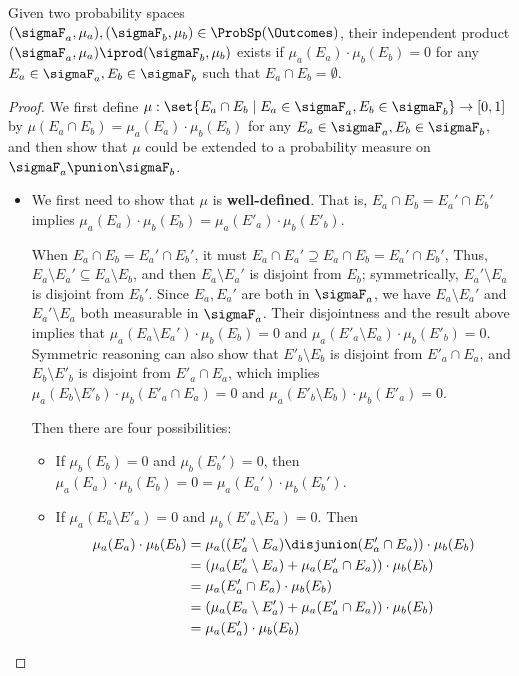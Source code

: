  \begin{lemma}
  \label{lemma:indep-prod-exists}
  Given two probability spaces
  $(\sigmaF_a, \mu_a), (\sigmaF_b, \mu_b) \in \ProbSp(\Outcomes)$,
  their independent product
  $(\sigmaF_a, \mu_a) \iprod (\sigmaF_b, \mu_b)$ exists
  if $\mu_a(E_a) \cdot \mu_b(E_b) = 0 $
  for any $E_a \in \sigmaF_a, E_b \in \sigmaF_b$ such that
  $E_a \cap E_b = \emptyset$.
 \end{lemma}

 \begin{proof}
We first define $\mu: \set{E_a \cap E_b \mid E_a \in \sigmaF_a, E_b \in \sigmaF_b}
  \to [0,1]$ by $\mu(E_a \cap E_b) = \mu_a(E_a) \cdot \mu_b(E_b)$
   for any $E_a \in \sigmaF_a, E_b \in \sigmaF_b$,
   and then show that $\mu$ could be extended to a probability
   measure on $\sigmaF_a \punion \sigmaF_b$.

  \begin{itemize}
   \item We first need to show that $\mu$ is \textbf{well-defined}.
    That is,
    $E_a \cap E_b = E_a' \cap E_b'$
    implies $\mu_a(E_a) \cdot \mu_b(E_b) = \mu_a(E'_a) \cdot \mu_b(E'_b)$.

     When $E_a \cap E_b = E_a' \cap E_b'$, it must $E_a \cap E_a' \supseteq
     E_a \cap E_b = E_a' \cap E_b'$, Thus, $E_a \setminus E_a' \subseteq E_a
     \setminus E_b$, and then $E_a \setminus E_a'$ is disjoint from $E_b$;
     symmetrically, $E_a' \setminus E_a$ is disjoint from $E_b'$.
     Since $E_a, E_a'$ are both in $\sigmaF_{a}$, we have $E_a \setminus E_a'$
     and $E_a' \setminus E_a$ both measurable in $\sigmaF_a$.
     Their disjointness and the result above implies that
     $\mu_a(E_a \setminus E_a') \cdot \mu_b(E_b) = 0$ and
     $\mu_a(E'_a \setminus E_a) \cdot \mu_b(E'_b) = 0$.
     Symmetric reasoning can also show that
     $E'_b \setminus E_b$ is disjoint from $E'_a \cap E_a$,
       and  $E_b \setminus E'_b$ is disjoint from $E'_a \cap E_a$,
       which implies
       $\mu_a(E_b \setminus E'_b) \cdot \mu_b(E'_a \cap E_a) = 0$ and
     $\mu_a(E'_b \setminus E_b) \cdot \mu_b(E'_a) = 0$.

     Then there are four possibilities:
     \begin{itemize}
      \item If $\mu_b(E_b) = 0$ and $\mu_b(E_b') = 0$,
       then $\mu_a(E_a) \cdot \mu_b(E_b) = 0 = \mu_a(E_a') \cdot \mu_b(E_b')$.
      \item If $\mu_a(E_a \setminus E'_a) = 0$ and $\mu_b(E'_a \setminus E_a) = 0$.
       Then
       \begin{align*}
        \mu_a(E_a) \cdot \mu_b(E_b) &=
        \mu_a((E'_a \setminus E_a) \disjunion (E'_a \cap E_a)) \cdot \mu_b(E_b) \\
          &= (\mu_a(E'_a \setminus E_a) + \mu_a(E'_a \cap E_a)) \cdot \mu_b(E_b) \\
          &= \mu_a(E'_a \cap E_a) \cdot \mu_b(E_b) \\
          &= (\mu_a(E_a \setminus E'_a) + \mu_a(E'_a \cap E_a)) \cdot \mu_b(E_b) \\
          &= \mu_a(E'_a) \cdot \mu_b(E_b)
       \end{align*}


\end{itemize}
\end{itemize}
\end{proof}
